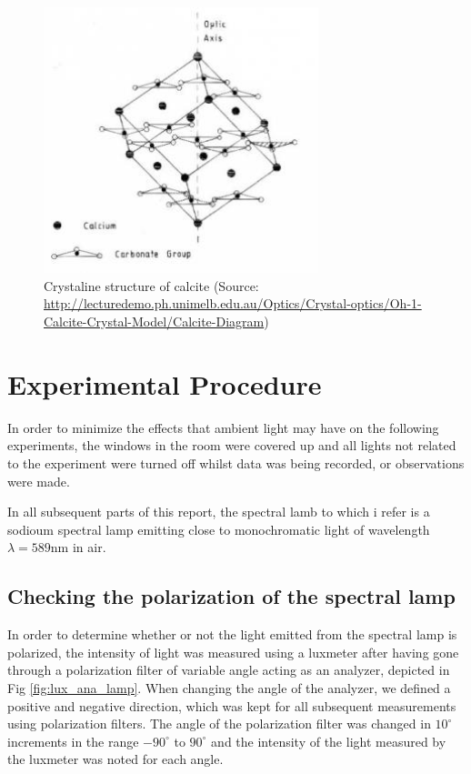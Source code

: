 \documentclass[11pt,a4paper]{article}
\begin{document}
    \begin{figure}[H]
      \center
      \includegraphics[width=8cm]{scripts/figs/calcite.jpg}
      \caption{Crystaline structure of calcite (Source: \url{http://lecturedemo.ph.unimelb.edu.au/Optics/Crystal-optics/Oh-1-Calcite-Crystal-Model/Calcite-Diagram})}
      \label{fig:calcite}
    \end{figure}

\section{\label{section:experimental}Experimental Procedure} 
  
  In order to minimize the effects that ambient light may have on the following experiments, the windows in the room were covered up and all lights not related to the experiment were turned off whilst data was being recorded, or observations were made.

  In all subsequent parts of this report, the spectral lamb to which i refer is a sodioum spectral lamp emitting close to monochromatic light of wavelength $\lambda=589$nm in air.

  \subsection{\label{subsect:polar_lamp}Checking the polarization of the spectral lamp}
    In order to determine whether or not the light emitted from the spectral lamp is polarized, the intensity of light was measured using a luxmeter\cite{data:luxmeter} after having gone through a polarization filter of variable angle acting as an analyzer, depicted in Fig \ref{fig:lux_ana_lamp}. When changing the angle of the analyzer, we defined a positive and negative direction, which was kept for all subsequent measurements using polarization filters. The angle of the polarization filter was changed in $10^\circ$ increments in the range $-90^\circ$ to $90^\circ$ and the intensity of the light measured by the luxmeter was noted for each angle.
\end{document}
